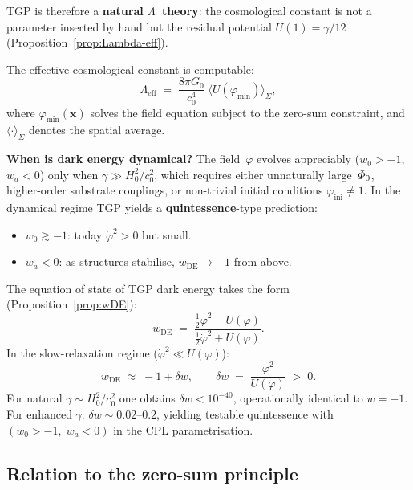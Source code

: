 TGP is therefore a \textbf{natural $\Lambda$~theory}: the
cosmological constant is not a parameter inserted by hand but
the residual potential $U(1) = \gamma/12$
(Proposition~\ref{prop:Lambda-eff}).

The effective cosmological constant is computable:
\begin{equation}\label{eq:Lambda-eff-def}
    \Lambda_{\mathrm{eff}}
    \;=\; \frac{8\pi G_0}{c_0^4}\;
    \bigl\langle U(\varphi_{\min}) \bigr\rangle_\Sigma,
\end{equation}
where $\varphi_{\min}(\mathbf{x})$ solves the field equation
subject to the zero-sum constraint, and
$\langle\cdot\rangle_\Sigma$ denotes the spatial average.

\medskip\noindent
\textbf{When is dark energy dynamical?}
The field~$\varphi$ evolves appreciably ($w_0 > -1$, $w_a < 0$)
only when $\gamma \gg H_0^2/c_0^2$, which requires either
unnaturally large~$\varPhi_0$, higher-order substrate couplings,
or non-trivial initial conditions $\varphi_{\mathrm{ini}} \neq 1$.
In the dynamical regime TGP yields a \textbf{quintessence}-type
prediction:
\begin{itemize}[nosep]
  \item $w_0 \gtrsim -1$: today $\dot{\varphi}^2 > 0$ but small.
  \item $w_a < 0$: as structures stabilise,
        $w_{\mathrm{DE}} \to -1$ from above.
\end{itemize}

The equation of state of TGP dark energy takes the form
(Proposition~\ref{prop:wDE}):
\begin{equation}\label{eq:wDE-def}
    w_{\mathrm{DE}}
    \;=\; \frac{\frac{1}{2}\dot{\varphi}^2 - U(\varphi)}
               {\frac{1}{2}\dot{\varphi}^2 + U(\varphi)}.
\end{equation}
In the slow-relaxation regime
($\dot{\varphi}^2 \ll U(\varphi)$):
\begin{equation}\label{eq:wDE-slow}
    w_{\mathrm{DE}} \;\approx\; -1 + \delta w,
    \qquad
    \delta w \;=\; \frac{\dot{\varphi}^2}{U(\varphi)} \;>\; 0.
\end{equation}
For natural $\gamma \sim H_0^2/c_0^2$ one obtains
$\delta w < 10^{-40}$, operationally identical to $w = -1$.
For enhanced $\gamma$: $\delta w \sim 0.02$--$0.2$, yielding
testable quintessence with $(w_0 > -1,\; w_a < 0)$ in the CPL
parametrisation.

\subsection{Relation to the zero-sum principle}\label{ssec:de-zero}

